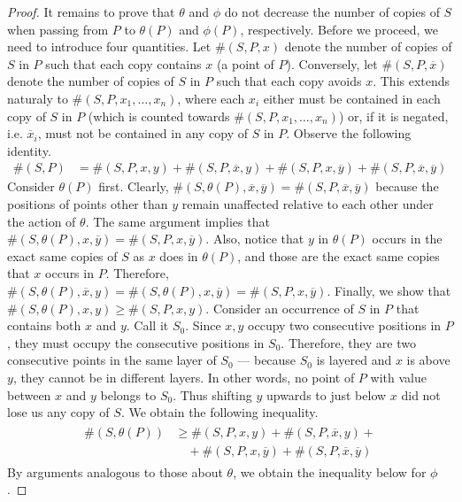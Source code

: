 \documentclass[12pt, a4paper, twoside]{report}
\begin{document}
\begin{proof}
It remains to prove that $\theta$ and $\phi$ do not decrease the number of copies of $S$ when passing from $P$ to $\theta(P)$ and $\phi(P)$, respectively. Before we proceed, we need to introduce four quantities. Let $\#(S,P,x)$ denote the number of copies of $S$ in $P$ such that each copy contains $x$ (a point of $P$). Conversely, let $\#(S,P,\overline{x})$ denote the number of copies of $S$ in $P$ such that each copy avoids $x$. This extends naturaly to $\#(S,P,x_1,\ldots,x_n)$, where each $x_i$ either must be contained in each copy of $S$ in $P$ (which is counted towards $\#(S,P,x_1,\ldots,x_n)$) or, if it is negated, i.e. $\overline{x}_i$, must not be contained in any copy of $S$ in $P$. Observe the following identity.
\begin{align}
  \#(S,P) &= \#(S,P,x,y) + \#(S,P,\overline{x},y) + \#(S,P,x,\overline{y}) + \#(S,P,\overline{x},\overline{y})
\end{align}
Consider $\theta(P)$ first. Clearly, $\#(S,\theta(P), \overline{x}, \overline{y}) = \#(S,P,\overline{x},\overline{y})$ because the positions of points other than $y$ remain unaffected relative to each other under the action of $\theta$. The same argument implies that $\#(S,\theta(P),x,\overline{y}) = \#(S,P,x,\overline{y})$. Also, notice that $y$ in $\theta(P)$ occurs in the exact same copies of $S$ as $x$ does in $\theta(P)$, and those are the exact same copies that $x$ occurs in $P$. Therefore, $\#(S,\theta(P),\overline{x},y) = \#(S,\theta(P),x, \overline{y}) = \#(S,P,x,\overline{y})$. Finally, we show that $\#(S,\theta(P), x, y) \geq  \#(S,P, x, y)$. Consider an occurrence of $S$ in $P$ that contains both $x$ and $y$. Call it $S_0$. Since $x,y$ occupy two consecutive positions in $P$, they must occupy the consecutive positions in $S_0$. Therefore, they are two consecutive points in the same layer of $S_0$ --- because $S_0$ is layered and $x$ is above $y$, they cannot be in different layers. In other words, no point of $P$ with value between $x$ and $y$ belongs to $S_0$. Thus shifting $y$ upwards to just below $x$ did not lose us any copy of $S$. We obtain the following inequality.
\begin{align}
  \begin{aligned}
  \#(S,\theta(P)) &\geq \#(S,P,x,y) + \#(S,P,\overline{x},y) +\\
                  &\quad+ \#(S,P,x,\overline{y}) + \#(S,P,\overline{x},\overline{y})
                \end{aligned}
\label{eq:theta_ineq}
\end{align}
By arguments analogous to those about $\theta$, we obtain the inequality below for $\phi$.

\end{proof}
\end{document}
